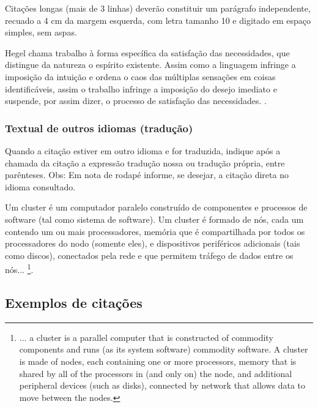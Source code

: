 Citações longas (mais de 3 linhas) deverão constituir um parágrafo independente, recuado a 4 cm da margem esquerda, 
com letra tamanho 10 e digitado em espaço simples, sem aspas.
\begin{citacaodireta}
Hegel chama trabalho à forma específica da satisfação das necessidades, que
distingue da natureza o espírito existente. Assim como a linguagem infringe
a imposição da intuição e ordena o caos das múltiplas sensações em coisas
identificáveis, assim o trabalho infringe a imposição do \hspace{0.1cm}desejo \hspace{0.1cm}imediato \hspace{0.1cm}e
suspende, por assim dizer, o processo de satisfação das necessidades.
\cite[25]{habermas1997}.
\end{citacaodireta}


\instrucao

\estrutura\subsubsection{\esp Textual de outros idiomas (tradução)}\instrucao

Quando a citação estiver em outro idioma e for traduzida, indique após a chamada da citação a expressão tradução nossa ou tradução própria, entre parênteses. Obs: Em nota de rodapé informe, se desejar, a citação direta no idioma consultado.

\begin{citacaodireta} 
Um cluster é um computador paralelo construído de componentes e processos de software (tal como sistema de software). 
Um cluster é formado de nós, cada um contendo um ou mais processadores, memória que é compartilhada por todos os processadores do nodo 
(somente eles), e dispositivos periféricos adicionais (tais como discos), conectados pela rede e que permitem tráfego de dados entre os nós...
\cite[p. 10, tradução nossa]{groupp2003}\footnote {... a cluster is a parallel computer that is constructed of commodity  components and runs 
(as its system software) commodity software. A cluster is made of nodes, each 
containing one or more processors, memory that is  shared 
by all of the processors in (and only on) the node, and additional peripheral devices (such as disks), connected by network that allows data to move between the nodes.}.
\end{citacaodireta}
 
\estrutura\subsection{\esp Exemplos de citações}\instrucao 

